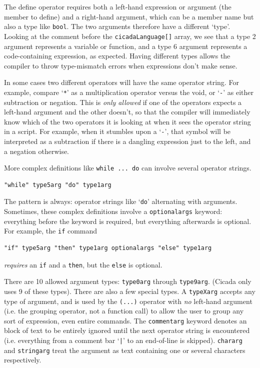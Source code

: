 \documentclass{article}
\newenvironment{code}{
       \begin{list}{}{
               \setlength{\leftmargin}{.4in}
               \setlength{\rightmargin}{0in}
               \setlength{\topsep}{.2in}
       }
       \small
       \item[] }
       { \end{list}   }
\begin{document}
\noindent The define operator requires both a left-hand expression or argument (the member to define) and a right-hand argument, which can be a member name but also a type like \verb#bool#.  The two arguments therefore have a different `type'.  Looking at the comment before the \verb#cicadaLanguage[]# array, we see that a type 2 argument represents a variable or function, and a type 6 argument represents a code-containing expression, as expected.  Having different types allows the compiler to throw type-mismatch errors when expressions don't make sense.

In some cases two different operators will have the same operator string.  For example, compare `\verb#*#' as a multiplication operator versus the void, or `\verb#-#' as either subtraction or negation.  This is \emph{only allowed} if one of the operators expects a left-hand argument and the other doesn't, so that the compiler will immediately know which of the two operators it is looking at when it sees the operator string in a script.  For example, when it stumbles upon a `\verb#-#', that symbol will be interpreted as a subtraction if there is a dangling expression just to the left, and a negation otherwise.

More complex definitions like \verb#while ... do# can involve several operator strings.

\begin{code} \begin{verbatim}
"while" type5arg "do" type1arg
\end{verbatim} \end{code}

\noindent The pattern is always:  operator strings like `\verb#do#' alternating with arguments.  Sometimes, these complex definitions involve a \verb#optionalargs# keyword:  everything before the keyword is required, but everything afterwards is optional.  For example, the \verb#if# command

\begin{code} \begin{verbatim}
"if" type5arg "then" type1arg optionalargs "else" type1arg
\end{verbatim} \end{code}

\noindent \emph{requires} an \verb#if# and a \verb#then#, but the \verb#else# is optional.

There are 10 allowed argument types:  \verb#type0arg# through \verb#type9arg#.  (Cicada only uses 9 of these types).  There are also a few special types.  A \verb#typeXarg# accepts any type of argument, and is used by the \verb#(...)# operator with \emph{no} left-hand argument (i.e. the grouping operator, not a function call) to allow the user to group any sort of expression, even entire commands.  The \verb#commentarg# keyword denotes an block of text to be entirely ignored until the next operator string is encountered (i.e. everything from a comment bar `\verb#|#' to an end-of-line is skipped).  \verb#chararg# and \verb#stringarg# treat the argument as text containing one or several characters respectively.
\end{document}
